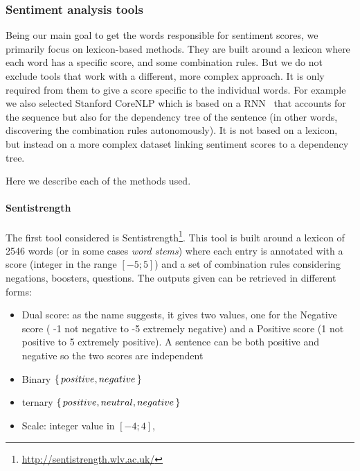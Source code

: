 \subsubsection{\statusgreen Sentiment analysis tools}

Being our main goal to get the words responsible for sentiment scores, we primarily focus on lexicon-based methods.
They are built around a lexicon where each word has a specific score, and some combination rules. But we do not exclude tools that work with a different, more complex approach. It is only required from them to give a score specific to the individual words. For example we also selected Stanford CoreNLP which is based on a RNN~\citep{socher2013recursive} that accounts for the sequence but also for the dependency tree of the sentence (in other words, discovering the combination rules autonomously). It is not based on a lexicon, but instead on a more complex dataset linking sentiment scores to a dependency tree.

Here we describe each of the methods used.

\paragraph{Sentistrength}
The first tool considered is Sentistrength\footnote{\url{http://sentistrength.wlv.ac.uk/}}. This tool is built around a lexicon of 2546 words (or in some cases \emph{word stems}) where each entry is annotated with a score (integer in the range $[-5;5]$) and a set of combination rules considering negations, boosters, questions. The outputs given can be retrieved in different forms:
\begin{itemize}
    \item Dual score: as the name suggests, it gives two values, one for the Negative score ( -1 not negative to -5 extremely negative) and a Positive score (1 not positive to 5 extremely positive). A sentence can be both positive and negative so the two scores are independent
    \item Binary $\set{positive, negative}$
    \item ternary $\set{positive, neutral, negative}$
    \item Scale: integer value in $[-4;4]$,
\end{itemize}

